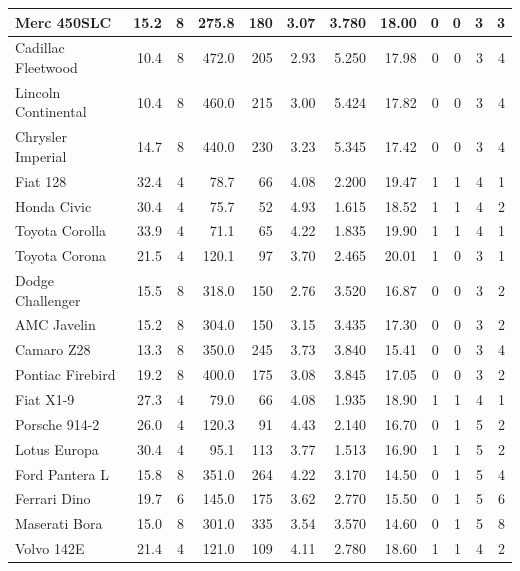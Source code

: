 \documentclass[
  letterpaper,
  DIV=11,
  numbers=noendperiod]{scrreprt}
\begin{document}
\begin{table}
{\begin{tabular}[t]{l|r|r|r|r|r|r|r|r|r|r|r}
\hline
Merc 450SLC & 15.2 & 8 & 275.8 & 180 & 3.07 & 3.780 & 18.00 & 0 & 0 & 3 & 3\\
\hline
Cadillac Fleetwood & 10.4 & 8 & 472.0 & 205 & 2.93 & 5.250 & 17.98 & 0 & 0 & 3 & 4\\
\hline
Lincoln Continental & 10.4 & 8 & 460.0 & 215 & 3.00 & 5.424 & 17.82 & 0 & 0 & 3 & 4\\
\hline
Chrysler Imperial & 14.7 & 8 & 440.0 & 230 & 3.23 & 5.345 & 17.42 & 0 & 0 & 3 & 4\\
\hline
Fiat 128 & 32.4 & 4 & 78.7 & 66 & 4.08 & 2.200 & 19.47 & 1 & 1 & 4 & 1\\
\hline
Honda Civic & 30.4 & 4 & 75.7 & 52 & 4.93 & 1.615 & 18.52 & 1 & 1 & 4 & 2\\
\hline
Toyota Corolla & 33.9 & 4 & 71.1 & 65 & 4.22 & 1.835 & 19.90 & 1 & 1 & 4 & 1\\
\hline
Toyota Corona & 21.5 & 4 & 120.1 & 97 & 3.70 & 2.465 & 20.01 & 1 & 0 & 3 & 1\\
\hline
Dodge Challenger & 15.5 & 8 & 318.0 & 150 & 2.76 & 3.520 & 16.87 & 0 & 0 & 3 & 2\\
\hline
AMC Javelin & 15.2 & 8 & 304.0 & 150 & 3.15 & 3.435 & 17.30 & 0 & 0 & 3 & 2\\
\hline
Camaro Z28 & 13.3 & 8 & 350.0 & 245 & 3.73 & 3.840 & 15.41 & 0 & 0 & 3 & 4\\
\hline
Pontiac Firebird & 19.2 & 8 & 400.0 & 175 & 3.08 & 3.845 & 17.05 & 0 & 0 & 3 & 2\\
\hline
Fiat X1-9 & 27.3 & 4 & 79.0 & 66 & 4.08 & 1.935 & 18.90 & 1 & 1 & 4 & 1\\
\hline
Porsche 914-2 & 26.0 & 4 & 120.3 & 91 & 4.43 & 2.140 & 16.70 & 0 & 1 & 5 & 2\\
\hline
Lotus Europa & 30.4 & 4 & 95.1 & 113 & 3.77 & 1.513 & 16.90 & 1 & 1 & 5 & 2\\
\hline
Ford Pantera L & 15.8 & 8 & 351.0 & 264 & 4.22 & 3.170 & 14.50 & 0 & 1 & 5 & 4\\
\hline
Ferrari Dino & 19.7 & 6 & 145.0 & 175 & 3.62 & 2.770 & 15.50 & 0 & 1 & 5 & 6\\
\hline
Maserati Bora & 15.0 & 8 & 301.0 & 335 & 3.54 & 3.570 & 14.60 & 0 & 1 & 5 & 8\\
\hline
Volvo 142E & 21.4 & 4 & 121.0 & 109 & 4.11 & 2.780 & 18.60 & 1 & 1 & 4 & 2\\
\hline
\end{tabular}

}

\end{table}%
\end{document}
